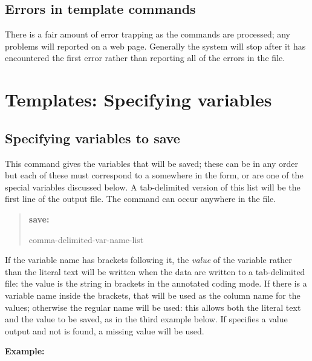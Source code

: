 \documentclass[letterpaper,10pt,english]{sphinxmanual}
\begin{document}
\subsection{Errors in template commands}
\label{forms:errors-in-template-commands}
There is a fair amount of error trapping as the commands are processed;
any problems will reported on a web page. Generally the system will
stop after it has encountered the first error rather than reporting
all of the errors in the file.


\section{Templates: Specifying variables}
\label{forms:templates-specifying-variables}

\subsection{Specifying variables to save}
\label{forms:specifying-variables-to-save}
This command gives the variables that will be saved; these can be in any
order but each of these must correspond to a  somewhere in
the form, or are one of the special variables discussed below. A
tab-delimited version of this list will be the first line of the output
file. The command can occur anywhere in the file.
\begin{quote}

\begin{DUlineblock}{0em}
\item[] \textbf{save:}
\item[] comma-delimited-var-name-list
\end{DUlineblock}
\end{quote}

If the variable name has brackets following it, the \emph{value} of the
variable rather than the literal text will be written when the data are
written to a tab-delimited file: the value is the string in brackets
\code{{[}…{]}} in the annotated coding mode. If there is a variable name inside
the brackets, that will be used as the column name for the values;
otherwise the regular name will be used: this allows both the literal
text and the value to be saved, as in the third example below. If
 specifies a value output and not is found, a missing value will
be used.

\textbf{Example:}
\begin{quote}

\begin{DUlineblock}{0em}
\item[] 
\item[] 
\item[] 
\end{DUlineblock}
\end{quote}
\end{document}

